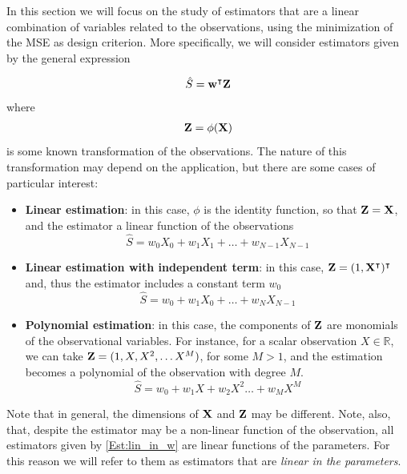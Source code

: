 In this section we will focus on the study of estimators that are a linear combination of variables related to the observations, using the minimization of the MSE as design criterion. More specifically, we will consider estimators given by the general expression
{\begin{align}
\label{Est:lin_in_w}
\hat S = {\bf w}^\intercal {\bf Z}
\end{align}
where 
\begin{align}
{\bf Z}=\phi({\bf X})
\end{align}
is some known transformation of the observations. The nature of this transformation may depend on the application, but there are some cases of particular interest:
\begin{itemize}
\item \textbf{Linear estimation}: in this case, $\phi$ is the identity function, so that ${\bf Z}={\bf X}$, and the estimator a linear function of the observations
\begin{equation}
\hat S = w_0 X_0 + w_1 X_1 + \dots + w_{N-1} X_{N-1}
\end{equation}
\item \textbf{Linear estimation with independent term}: in this case, ${\bf Z}=(1, {\bf X}^\intercal)^\intercal$ and, thus the estimator includes a constant term $w_0$
\begin{equation}
\label{Est:blin}
\hat S = w_0 + w_1 X_0 + \dots + w_{N} X_{N-1}
\end{equation}
\item \textbf{Polynomial estimation}: in this case, the components of ${\bf Z}$ are monomials of the observational variables. For instance, for a scalar observation $X \in \mathbb{R}$, we can take ${\bf Z} = (1, X, X^2, \ldots X^M)$, for some $M>1$, and the estimation becomes a polynomial of the observation with degree $M$.
\begin{equation}
\hat S = w_0 + w_1 X + w_2 X^2 \dots + w_M X^M
\end{equation}
\end{itemize}}

{Note that in general, the dimensions of ${\bf X}$ and ${\bf Z}$ may be different. Note, also, that, despite the estimator may be a non-linear function of the observation, all estimators given by \eqref{Est:lin_in_w} are linear functions of the parameters. For this reason we will refer to them as estimators that are \textit{linear in the parameters}.}

